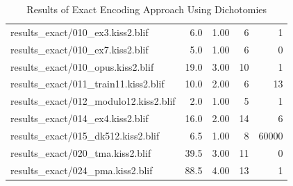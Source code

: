 \begin{table}[h]
\begin{tabular}{|l|r|r|r|r|}
		results\_exact/010\_ex3.kiss2.blif & 6.0 & 1.00 & 6 & 1\\
		results\_exact/010\_ex7.kiss2.blif & 5.0 & 1.00 & 6 & 0\\
		results\_exact/010\_opus.kiss2.blif & 19.0 & 3.00 & 10 & 1\\
		results\_exact/011\_train11.kiss2.blif & 10.0 & 2.00 & 6 & 13\\
		results\_exact/012\_modulo12.kiss2.blif & 2.0 & 1.00 & 5 & 1\\
		results\_exact/014\_ex4.kiss2.blif & 16.0 & 2.00 & 14 & 6\\
		results\_exact/015\_dk512.kiss2.blif & 6.5 & 1.00 & 8 & 60000\\
		results\_exact/020\_tma.kiss2.blif & 39.5 & 3.00 & 11 & 0\\
		results\_exact/024\_pma.kiss2.blif & 88.5 & 4.00 & 13 & 1\\
		\hline
	\end{tabular}
	\caption{Results of Exact Encoding Approach Using Dichotomies}
	\label{tab:exact}
\end{table}

